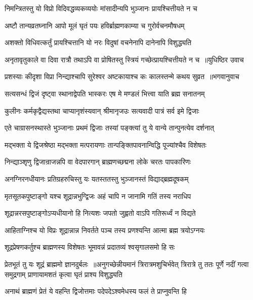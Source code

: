 \twolineshloka
{निमन्त्रितस्तु यो विप्रो विदिवद्धव्यकव्ययोः}
{मांसादीन्यपि भुञ्जानः प्रायश्चित्तीयते न च}


\twolineshloka
{अष्टौ तान्यव्रतघ्नानि आपो मूलं घृतं पयः}
{हविर्ब्राह्मणकाम्या च गुरोर्वचनमौषधम्}


\twolineshloka
{अशक्तो विधिवत्कर्तुं प्रायश्चित्तानि यो नरः}
{विदुषां वचनेनापि दानेनापि विशुद्ध्यति}


\threelineshloka
{अनृतावृतुकाले वा दिवा रात्रौ तथाऽपि वा}
{प्रोषितस्तु स्त्रियं गच्छेत्प्रायश्चित्तीयते न च ॥युधिष्ठिर उवाच}
{}


\threelineshloka
{प्रशस्याः कीदृशा विप्रा निन्द्याश्चापि सुरेश्वर}
{अष्टकायाश्च कः कालस्तन्मे कथय सुव्रत ॥भगवानुवाच}
{}


\twolineshloka
{सत्यसन्धं द्विजं दृष्ट्वा स्थानाद्वेपति भास्करः}
{एष मे मण्डलं भित्त्वा याति ब्रह्म सनातनम्}


\twolineshloka
{कुलीनः कर्मकृद्वैद्यस्तथा चाप्यानृशंस्यवान्}
{श्रीमानृजउः सत्यवादी पात्रं सर्व इमे द्विजाः}


\twolineshloka
{एते चाग्रासनस्थास्ते भुञ्जानाः प्रथमं द्विजाः}
{तस्यां पङ्क्त्यां तु ये वान्ये तान्पुनत्येव दर्शनात्}


\twolineshloka
{मद्भक्ता ये द्विजश्रेष्ठा मद्भक्ता मत्परायणाः}
{तान्पङ्क्तिपावनान्विद्धि पूज्यांश्चैव विशेषतः}


\twolineshloka
{निन्द्याञ्शृणु द्विजान्राजन्नपि वा वेदपारगान्}
{ब्राह्मणच्छद्मना लोके चरतः पापकारिणः}


\twolineshloka
{अनग्निरनधीयानः प्रतिग्रहरुचिस्तु यः}
{यतस्ततस्तु भुञ्जानस्तं विद्याद्ब्रह्मदूषकम्}


\twolineshloka
{मृतसूतकपुष्टाङ्गो यश्च शूद्रान्नभुग्द्विजः}
{अहं चापि न जानामि गतिं तस्य नराधिप}


\twolineshloka
{शूद्रान्नरसपुष्टाङ्गोऽप्यधीयानो हि नित्यशः}
{जपतो जुह्वतो वाऽपि गतिरूर्ध्वं न विद्यते}


\twolineshloka
{आहिताग्निश्च यो विप्रः शूद्रान्नान्न निवर्तते}
{पञ्च तस्य प्रणश्यन्ति आत्मा ब्रह्म त्रयोऽग्नयः}


\twolineshloka
{शूद्रप्रेषणकर्तुश्च ब्राह्मणस्य विशेषतः}
{भूमावन्नं प्रदातव्यं श्वसृगालसमो हि सः}


प्रेतभूतं तु यः शूद्रं ब्राह्ममो ज्ञानदुर्बलः ॥अनुगच्छेन्नीयमानं त्रिरात्रमशुचिर्भवेत्
\twolineshloka
{त्रिरात्रे तु ततः पूर्णे नदीं गत्वा समुद्रगाम्}
{प्राणायामशतं कृत्वा घृतं प्राश्य विशुद्ध्यति}


\twolineshloka
{अनाथं ब्राह्मणं प्रेतं ये वहन्ति द्विजोत्तमाः}
{पदेपदेऽश्वमेधस्य फलं ते प्राप्नुवन्ति हि}


